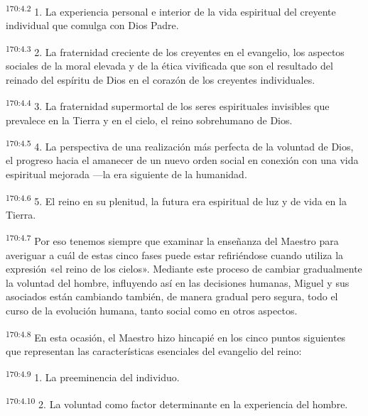 \par 
\textsuperscript{170:4.2} 1. La experiencia personal e interior de la vida espiritual del creyente individual que comulga con Dios Padre.

\par 
\textsuperscript{170:4.3} 2. La fraternidad creciente de los creyentes en el evangelio, los aspectos sociales de la moral elevada y de la ética vivificada que son el resultado del reinado del espíritu de Dios en el corazón de los creyentes individuales.

\par 
\textsuperscript{170:4.4} 3. La fraternidad supermortal de los seres espirituales invisibles que prevalece en la Tierra y en el cielo, el reino sobrehumano de Dios.

\par 
\textsuperscript{170:4.5} 4. La perspectiva de una realización más perfecta de la voluntad de Dios, el progreso hacia el amanecer de un nuevo orden social en conexión con una vida espiritual mejorada ---la era siguiente de la humanidad.

\par 
\textsuperscript{170:4.6} 5. El reino en su plenitud, la futura era espiritual de luz y de vida en la Tierra.

\par 
\textsuperscript{170:4.7} Por eso tenemos siempre que examinar la enseñanza del Maestro para averiguar a cuál de estas cinco fases puede estar refiriéndose cuando utiliza la expresión «el reino de los cielos». Mediante este proceso de cambiar gradualmente la voluntad del hombre, influyendo así en las decisiones humanas, Miguel y sus asociados están cambiando también, de manera gradual pero segura, todo el curso de la evolución humana, tanto social como en otros aspectos.

\par 
\textsuperscript{170:4.8} En esta ocasión, el Maestro hizo hincapié en los cinco puntos siguientes que representan las características esenciales del evangelio del reino:

\par 
\textsuperscript{170:4.9} 1. La preeminencia del individuo.

\par 
\textsuperscript{170:4.10} 2. La voluntad como factor determinante en la experiencia del hombre.

